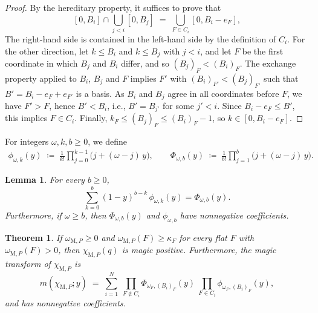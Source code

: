 \documentclass[11pt,a4paper,reqno]{amsart}
\theoremstyle{results}
\newtheorem{lemma}[thm]{Lemma}
\theoremstyle{definitions}
\newcommand{\M}{\mathrm{M}}
\newtheorem{theorem}[thm]{Theorem}
\newcommand{\capa}{\kappa}   %
\begin{document}
\begin{proof}
  By the hereditary property, it suffices to prove that
  \[
    [0, B_i] \cap \bigcup_{j < i} [0, B_j] \;=\; \bigcup_{F \in C_i} [0, B_i - e_F],
  \]
  The right-hand side is contained in the left-hand side by the definition of $C_i$.  For
  the other direction, let $k \leqslant B_i$ and $k \leqslant B_j$ with $j < i$, and let $F$ be the
  first coordinate in which $B_j$ and $B_i$ differ, and so $(B_j)_F < (B_i)_F$.
  The exchange property applied to $B_i$, $B_j$ and $F$ implies $F'$ with
  $(B_i)_{F'} < (B_j)_{F'}$ such that $B' = B_i - e_F + e_{F'}$ is a basis.  As
  $B_i$ and $B_j$ agree in all coordinates before $F$, we have $F' > F$, hence $B' < B_i$,
  i.e., $B' = B_{j'}$ for some $j' < i$. Since $B_i - e_F \leqslant B'$, this implies
  $F \in C_i$. Finally, $k_F \leqslant (B_j)_F \leqslant (B_i)_F - 1$, so $k \in [0, B_i - e_F]$.
\end{proof}

For integers $\omega, k, b \geqslant 0$, we define 
\begin{align*}
  \phi_{\omega,k}(y) \;\coloneqq\; \frac{1}{k!}\prod_{j=0}^{k-1}\big(j + (\omega-j)\,y\big), \qquad
  \Phi_{\omega, b}(y) \;\coloneqq\; \frac{1}{b!}\prod_{j=1}^{b}\big(j + (\omega-j)\,y\big).
\end{align*}

\begin{lemma}\label{lem:box-factors}
  For every $b \geqslant 0$,
  \[
  \sum_{k=0}^{b} (1-y)^{b-k}\,\phi_{\omega,k}(y) = \Phi_{\omega, b}(y).
  \]
  Furthermore, if $\omega \geqslant b$, then $\Phi_{\omega,b}(y)$ and $\phi_{\omega,b}$ have nonnegative coefficients.
\end{lemma}


\begin{theorem}\label{thm:sufficient}
  If $\omega_{\M, P} \geqslant 0$ and $\omega_{\M, P}(F) \geqslant \capa_F$ for every flat $F$ with $\omega_{\M, P}(F) > 0$, then $\chi_{\M, P}(q)$ is magic
  positive.  Furthermore, the magic transform of $\chi_{\M,P}$ is 
  \begin{equation}\label{eq:box-formula}
    m(\chi_{\M,P}; y) \;=\; \sum_{i=1}^{N}\ \prod_{F \notin C_i}\Phi_{\omega_F, (B_i)_F}(y)\
    \prod_{F \in C_i}\phi_{\omega_F,(B_i)_F}(y),
  \end{equation}
  and has nonnegative coefficients.
\end{theorem}
\end{document}
